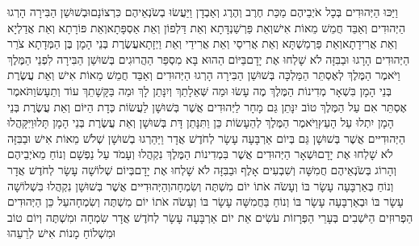 \documentclass[../main/main.tex]{subfiles}
\begin{document}
\begin{multicols*}{\ncols}
וַיַּכּוּ הַיְּהוּדִים בְּכָל אֹיְבֵיהֶם מַכַּת חֶרֶב וְהֶרֶג וְאַבְדָן וַיַּעֲשׂוּ בְשֹׂנְאֵיהֶם כִּרְצוֹנָם\PreVerseSpace{}וּבְשׁוּשַׁן הַבִּירָה הָרְגוּ הַיְּהוּדִים וְאַבֵּד חֲמֵשׁ מֵאוֹת אִישׁ\PreVerseSpace{}וְאֵת פַּרְשַׁנְדָּתָא וְאֵת דַּלְפוֹן וְאֵת אַסְפָּתָא\PreVerseSpace{}וְאֵת פּוֹרָתָא וְאֵת אֲדַלְיָא וְאֵת אֲרִידָתָא\PreVerseSpace{}וְאֵת פַּרְמַשְׁתָּא וְאֵת אֲרִיסַי וְאֵת אֲרִידַי וְאֵת וַיְזָתָא\PreVerseSpace{}עֲשֶׂרֶת בְּנֵי הָמָן בֶּן הַמְּדָתָא צֹרֵר הַיְּהוּדִים הָרָגוּ וּבַבִּזָּה לֹא שָׁלְחוּ אֶת יָדָם\PreVerseSpace{}בַּיּוֹם הַהוּא בָּא מִסְפַּר הַהֲרוּגִים בְּשׁוּשַׁן הַבִּירָה לִפְנֵי הַמֶּלֶךְ \ClosedSection{}וַיֹּאמֶר הַמֶּלֶךְ לְאֶסְתֵּר הַמַּלְכָּה בְּשׁוּשַׁן הַבִּירָה הָרְגוּ הַיְּהוּדִים וְאַבֵּד חֲמֵשׁ מֵאוֹת אִישׁ וְאֵת עֲשֶׂרֶת בְּנֵי הָמָן בִּשְׁאָר מְדִינוֹת הַמֶּלֶךְ מֶה עָשׂוּ וּמַה שְּׁאֵלָתֵךְ וְיִנָּתֵן לָךְ וּמַה בַּקָּשָׁתֵךְ עוֹד וְתֵעָשׂ\PreVerseSpace{}וַתֹּאמֶר אֶסְתֵּר אִם עַל הַמֶּלֶךְ טוֹב יִנָּתֵן גַּם מָחָר לַיְּהוּדִים אֲשֶׁר בְּשׁוּשָׁן לַעֲשׂוֹת כְּדָת הַיּוֹם וְאֵת עֲשֶׂרֶת בְּנֵי הָמָן יִתְלוּ עַל הָעֵץ\PreVerseSpace{}וַיֹּאמֶר הַמֶּלֶךְ לְהֵעָשׂוֹת כֵּן וַתִּנָּתֵן דָּת בְּשׁוּשָׁן וְאֵת עֲשֶׂרֶת בְּנֵי הָמָן תָּלוּ\PreVerseSpace{}וַיִּקָּהֲלוּ הַיְּהוּדִיּים אֲשֶׁר בְּשׁוּשָׁן גַּם בְּיוֹם אַרְבָּעָה עָשָׂר לְחֹדֶשׁ אֲדָר וַיַּהַרְגוּ בְשׁוּשָׁן שְׁלֹשׁ מֵאוֹת אִישׁ וּבַבִּזָּה לֹא שָׁלְחוּ אֶת יָדָם\PreVerseSpace{}וּשְׁאָר הַיְּהוּדִים אֲשֶׁר בִּמְדִינוֹת הַמֶּלֶךְ נִקְהֲלוּ וְעָמֹד עַל נַפְשָׁם וְנוֹחַ מֵאֹיְבֵיהֶם וְהָרוֹג בְּשֹׂנְאֵיהֶם חֲמִשָּׁה וְשִׁבְעִים אָלֶף וּבַבִּזָּה לֹא שָׁלְחוּ אֶת יָדָם\PreVerseSpace{}בְּיוֹם שְׁלוֹשָׁה עָשָׂר לְחֹדֶשׁ אֲדָר וְנוֹחַ בְּאַרְבָּעָה עָשָׂר בּוֹ וְעָשֹׂה אֹתוֹ יוֹם מִשְׁתֶּה וְשִׂמְחָה\PreVerseSpace{}וְהַיְּהוּדִיּים אֲשֶׁר בְּשׁוּשָׁן נִקְהֲלוּ בִּשְׁלוֹשָׁה עָשָׂר בּוֹ וּבְאַרְבָּעָה עָשָׂר בּוֹ וְנוֹחַ בַּחֲמִשָּׁה עָשָׂר בּוֹ וְעָשֹׂה אֹתוֹ יוֹם מִשְׁתֶּה וְשִׂמְחָה\PreVerseSpace{}עַל כֵּן הַיְּהוּדִים הַפְּרוּזִים הַיֹּשְׁבִים בְּעָרֵי הַפְּרָזוֹת עֹשִׂים אֵת יוֹם אַרְבָּעָה עָשָׂר לְחֹדֶשׁ אֲדָר שִׂמְחָה וּמִשְׁתֶּה וְיוֹם טוֹב וּמִשְׁלוֹחַ מָנוֹת אִישׁ לְרֵעֵהוּ\OpenSection{}\par

\end{multicols*}
\end{document}
